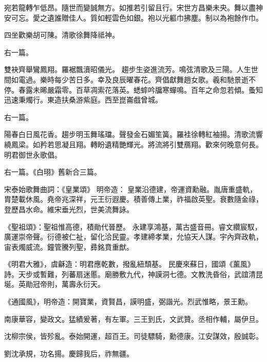 \begin{pinyinscope}
 宛若龍轉乍低昂。隨世而變誠無方。如推若引留且行。宋世方昌樂未央。舞以盡神安可忘。愛之遺誰贈佳人。質如輕雲色如銀。袍以光軀巾拂塵。制以為袍餘作巾。



 四坐歡樂胡可陳。清歌徐舞降祗神。



 右一篇。



 雙袂齊舉鸞鳳翔。羅裾飄濆昭儀光。
 趨步生姿進流芳。鳴弦清歌及三陽。人生世間如電過。樂時每少苦日多。幸及良辰曜春花。齊倡獻舞趙女歌。羲和馳景逝不停。春露未晞嚴霜零。百草凋索花落英。蟋蟀吟牖寒蟬鳴。百年之命忽若傾。蚤知迅速秉燭行。東造扶桑游紫庭。西至崑崙戲曾城。



 右一篇。



 陽春白日風花香。趨步明玉舞瑤璫。聲發金石媚笙簧。羅袿徐轉紅袖揚。清歌流響繞鳳梁。如矜若思凝且翔。轉盼遺精艷輝光。將流將引雙鴈翔。歡來何晚意何長。明君御世永歌倡。



 右一篇。《白珝》舊新合三篇。


宋泰始歌舞曲詞：《皇業頌》
 明帝造：
 皇業沿德建，帝運資勳融。胤唐重盛軌，胄楚載休風。堯帝兆深祥，元王衍遐慶。積善傳上業，祚福啟英聖。衰數隨金祿，登歷昌水命。維宋垂光烈，世美流舞詠。



 《聖祖頌》：聖祖惟高德，積勛代晉歷。
 永建享鴻基，萬古盛音冊。睿文纘宸馭，廣運崇帝聲。衍德被仁祉，留化洽民靈。孝建締孝業，允協天人謀。宇內齊政軌，宙表燭威流。鐘管騰列聖，彞銘賁重猷。



 《明君大雅》，虞龢造：明君應乾數，撥亂紐頹基。
 民慶來蘇日，國頌《薰風》詩。天步或暫難，列蕃扇迷慝。廟勝敷九代，神謨洞七德。文教洗昏俗，武誼清昆埏。英勛冠帝則，萬壽永衍天。



 《通國風》，明帝造：開寶業，資賢昌，謨明盛，弼諧光。烈武惟略，景王勳。



 南康華容，變政文。猛績爰著，有左軍。三王到氏，文武贊。丞相作輔，屬伊旦。



 沈柳宗侯，皆殄亂。泰始開運，超百王。司徒驃騎，勳德康。江安謀效，殷誠彰。



 劉沈承規，功名揚。慶歸我后，祚無疆。




\end{pinyinscope}
